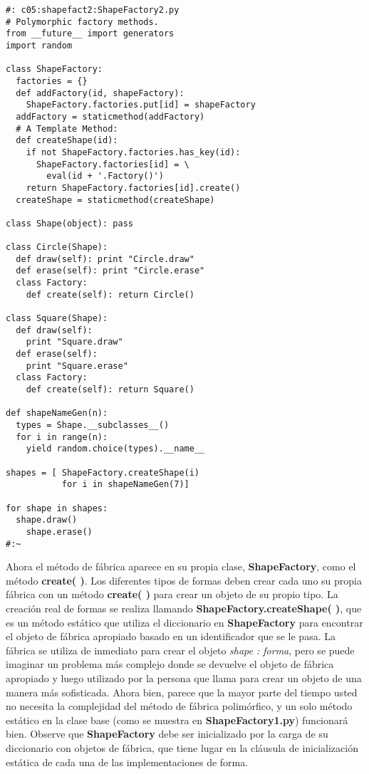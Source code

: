 \begin{lstlisting} 
#: c05:shapefact2:ShapeFactory2.py 
# Polymorphic factory methods. 
from __future__ import generators 
import random 

class ShapeFactory: 
  factories = {} 
  def addFactory(id, shapeFactory): 
    ShapeFactory.factories.put[id] = shapeFactory 
  addFactory = staticmethod(addFactory) 
  # A Template Method: 
  def createShape(id): 
    if not ShapeFactory.factories.has_key(id): 
      ShapeFactory.factories[id] = \ 
        eval(id + '.Factory()') 
    return ShapeFactory.factories[id].create() 
  createShape = staticmethod(createShape) 
  
class Shape(object): pass 

class Circle(Shape): 
  def draw(self): print "Circle.draw"  
  def erase(self): print "Circle.erase" 
  class Factory: 
    def create(self): return Circle()  
    
class Square(Shape): 
  def draw(self):  
    print "Square.draw"  
  def erase(self):  
    print "Square.erase"  
  class Factory: 
    def create(self): return Square() 
    
def shapeNameGen(n): 
  types = Shape.__subclasses__() 
  for i in range(n): 
    yield random.choice(types).__name__ 
    
shapes = [ ShapeFactory.createShape(i)  
           for i in shapeNameGen(7)] 
           
for shape in shapes: 
  shape.draw() 
    shape.erase() 
#:~ 
\end{lstlisting}
Ahora el método de fábrica aparece en su propia clase, \textbf{ShapeFactory}, como el método \textbf{create( )}. Los diferentes tipos de formas deben crear cada uno su propia fábrica con un método \textbf{create( )} para crear un objeto de su propio tipo. La creación real de formas se realiza llamando \textbf{ShapeFactory.createShape( )}, que es un método estático que utiliza el diccionario en \textbf{ShapeFactory} para encontrar el objeto de fábrica apropiado basado en un identificador que se le pasa. La fábrica se utiliza de inmediato para crear el objeto \textit{shape : forma}, pero se puede imaginar un problema más complejo donde se devuelve el objeto de fábrica apropiado y luego utilizado por la persona que llama para crear un objeto de una manera más sofisticada. Ahora bien, parece que la mayor parte del tiempo usted no necesita la complejidad del método de fábrica polimórfico, y un solo método estático en la clase base (como se muestra en \textbf{ShapeFactory1.py}) funcionará bien. Observe que \textbf{ShapeFactory} debe ser inicializado por la carga de su diccionario con objetos de fábrica, que tiene lugar en la cláusula de inicialización estática de cada una de las implementaciones de forma.   \newline

